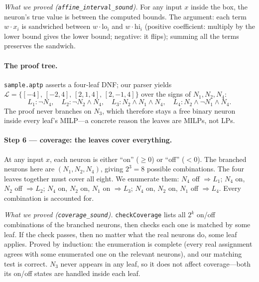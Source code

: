 \documentclass[runningheads]{llncs}
\newcommand{\leaf}{L}
\newcommand{\leaves}{\mathcal{L}}
\newcommand{\code}[1]{\texttt{#1}}
\begin{document}
\emph{What we proved (\code{affine\_interval\_sound}).} For any input $x$ inside the
box, the neuron's true value is between the computed bounds. The argument: each term
$w\cdot x_i$ is sandwiched between $w\cdot\mathrm{lo}_i$ and $w\cdot\mathrm{hi}_i$
(positive coefficient: multiply by the lower bound gives the lower bound; negative:
it flips); summing all the terms preserves the sandwich.

\paragraph{The proof tree.} \code{sample.aptp} asserts a four-leaf DNF; our parser
yields $\leaves=\{[-4],\,[-2,4],\,[2,1,4],\,[2,-1,4]\}$ over the signs of
$N_1,N_2,N_4$:
\[
\leaf_1:\lnot N_4,\quad \leaf_2:\lnot N_2\wedge N_4,\quad
\leaf_3:N_2\wedge N_1\wedge N_4,\quad \leaf_4:N_2\wedge\lnot N_1\wedge N_4.
\]
The proof never branches on $N_3$, which therefore stays a free binary neuron inside
every leaf's MILP---a concrete reason the leaves are MILPs, not LPs.

\paragraph{Step 6 --- coverage: the leaves cover everything.}
At any input $x$, each neuron is either ``on'' ($\ge0$) or ``off'' ($<0$). The
branched neurons here are $(N_1,N_2,N_4)$, giving $2^3=8$ possible combinations. The
four leaves together must cover all eight. We enumerate them: $N_4$ off
$\Rightarrow\leaf_1$; $N_4$ on, $N_2$ off $\Rightarrow\leaf_2$; $N_4$ on, $N_2$ on,
$N_1$ on $\Rightarrow\leaf_3$; $N_4$ on, $N_2$ on, $N_1$ off $\Rightarrow\leaf_4$.
Every combination is accounted for.

\emph{What we proved (\code{coverage\_sound}).} \code{checkCoverage} lists all $2^k$
on/off combinations of the branched neurons, then checks each one is matched by some
leaf. If the check passes, then no matter what the real neurons do, some leaf
applies. Proved by induction: the enumeration is complete (every real assignment agrees
with some enumerated one on the relevant neurons), and our matching test is correct.
$N_3$ never appears in any leaf, so it does not affect coverage---both its on/off
states are handled inside each leaf.
\end{document}
